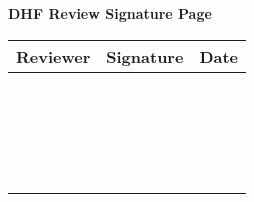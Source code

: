 \thispagestyle{empty}

\begin{center}
	\textbf{\LARGE DHF Review Signature Page}
\end{center}

\renewcommand{\arraystretch}{2}
\begin{center}
	\begin{tabular}{|p{5cm}|p{5cm}|p{5cm}|} 
		\hline
		Reviewer & Signature & Date                   \\ 
		\hline
		&           &                        \\ 
		\hline
		&           &                        \\ 
		\hline
		&           &                        \\ 
		\hline
		&           &                        \\ 
		\hline
		&           &                        \\ 
		\hline
		&           &                        \\ 
		\hline
		&           &                        \\ 
		\hline
		&           &                        \\ 
		\hline
		&           &                        \\ 
		\hline
		&           &                        \\ 
		\hline
		&           &                        \\ 
		\hline
		&           &                        \\ 
		\hline
		&           &                        \\ 
		\hline
		&           &                        \\ 
		\hline
		&           &                        \\ 
		\hline
		&           &                        \\ 
		\hline
		&           &                        \\ 
		\hline
		&           &                        \\ 
		\hline
		&           &                        \\ 
		\hline
		&           &                        \\ 
		\hline

		
	\end{tabular}
\end{center}